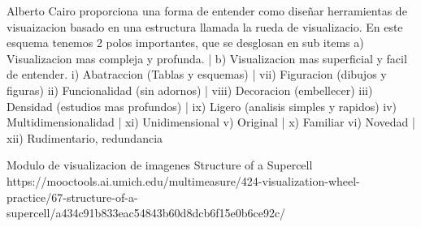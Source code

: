 Alberto Cairo proporciona una forma de entender como diseñar herramientas de visuaizacion basado en una estructura llamada la rueda de visualizacio.
En este esquema tenemos 2 polos importantes, que se desglosan en sub items
a) Visualizacion mas compleja y profunda.   | b) Visualizacion mas superficial y facil de entender.
    i) Abatraccion (Tablas y esquemas)      |      vii) Figuracion (dibujos y figuras)
    ii) Funcionalidad (sin adornos)         |      viii) Decoracion (embellecer)
    iii) Densidad (estudios mas profundos)  |      ix) Ligero (analisis simples y rapidos)
    iv) Multidimensionalidad                |      xi) Unidimensional
    v) Original                             |      x) Familiar
    vi) Novedad                             |      xii) Rudimentario, redundancia


Modulo de visualizacion de imagenes
Structure of a Supercell
https://mooctools.ai.umich.edu/multimeasure/424-visualization-wheel-practice/67-structure-of-a-supercell/a434c91b833eac54843b60d8dcb6f15e0b6ce92c/
